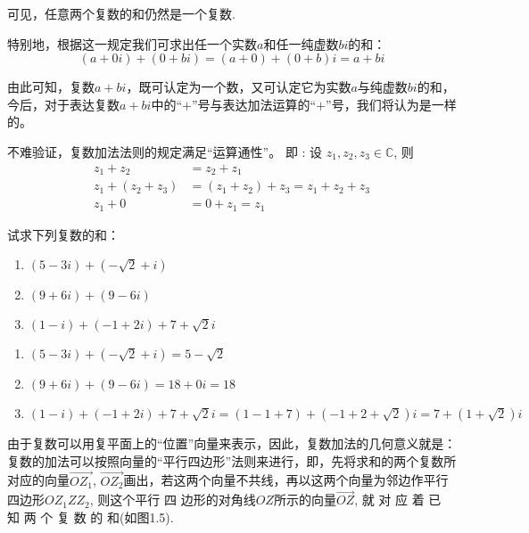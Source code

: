 可见，任意两个复数的和仍然是一个复数.

特别地，根据这一规定我们可求出任一个实数$a$和任一纯虚数$bi$的和：
\[(a+0i)+(0+bi)=(a+0)+(0+b)i=a+bi\]

由此可知，复数$a+bi$，既可认定为一个数，又可认定它为实数$a$与纯虚数$bi$的和，今后，对于表达复数$a+bi$中的“$+$”号与表达加法运算的“$+$”号，我们将认为是一样的。

不难验证，复数加法法则的规定满足“运算通性”。
即 : 设 $z_1, z_2, z_3\in \mathbb{C}$, 则
\begin{align}
    z_{1}+ z_2 &= z_{2}+ z_{1}\tag{交换律成立}\\
    z_{1}+\left( z_{2}+z_{3} \right)&=\left( z_{1}+z_{2} \right)+z_{3}=z_{1}+z_{2}+z_{3}\tag{结合律成立}\\
    z_{1}+ 0&= 0+ z_{1}= z_{1}\tag{零的运算特性保持}
\end{align}

\begin{example}
    试求下列复数的和：
\begin{enumerate}[(1)]
    \item $(5-3i)+(-\sqrt{2}+i)$
    \item $( 9+ 6i) + ( 9- 6i)$
    \item $( 1- i) + ( - 1+ 2i) + 7+ \sqrt {2}i$
\end{enumerate}
\end{example}

\begin{solution}
\begin{enumerate}[(1)]
    \item $( 5- 3i) + ( - \sqrt {2}+ i) = 5- \sqrt {2}$
    \item $( 9+ 6i) + ( 9- 6i) = 18+ 0i= 18$
    \item $( 1- i) + ( - 1+ 2i) +7+ \sqrt {2}i=(1-1+7)+(-1+2+\sqrt{2})i=7+(1+\sqrt{2})i$
\end{enumerate}
\end{solution}


由于复数可以用复平面上的“位置”向量来表示，因此，复数加法的几何意义就是：复数的加法可以按照向量的“平行四边形”法则来进行，即，先将求和的两个复数所对应的向量$\overrightarrow{OZ_{1}}$, $\overrightarrow{OZ_{2}}$画出，若这两个向量不共线，再以这两个向量为邻边作平行四边形$OZ_1ZZ_2$, 则这个平行 四 边形的对角线$OZ$所示的向量$\overrightarrow{OZ}$, 就 对 应 着 已 知 两 个 复 数 的 和(如图1.5).

\begin{figure}[htp]
    \centering
{}
    \caption{}
\end{figure}

